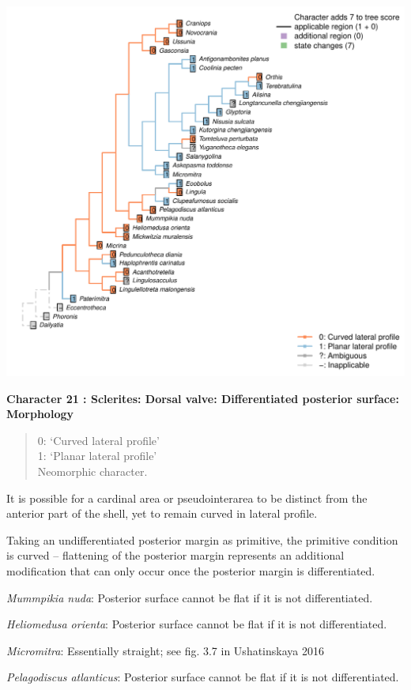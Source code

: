 \documentclass[]{book}
\theoremstyle{definition}
\theoremstyle{definition}
\theoremstyle{definition}
\theoremstyle{remark}
\begin{document}
\includegraphics{Brachiopod_phylogeny_files/figure-latex/unnamed-chunk-5-21.pdf}

\textbf{Character 21 : Sclerites: Dorsal valve: Differentiated posterior
surface: Morphology }

\begin{quote}
0: `Curved lateral profile'\\
1: `Planar lateral profile'\\
Neomorphic character.
\end{quote}

It is possible for a cardinal area or pseudointerarea to be distinct
from the anterior part of the shell, yet to remain curved in lateral
profile.

Taking an undifferentiated posterior margin as primitive, the primitive
condition is curved -- flattening of the posterior margin represents an
additional modification that can only occur once the posterior margin is
differentiated.

\emph{Mummpikia nuda}: Posterior surface cannot be flat if it is not
differentiated.

\emph{Heliomedusa orienta}: Posterior surface cannot be flat if it is
not differentiated.

\emph{Micromitra}: Essentially straight; see fig. 3.7 in Ushatinskaya
2016

\emph{Pelagodiscus atlanticus}: Posterior surface cannot be flat if it
is not differentiated.
\end{document}
